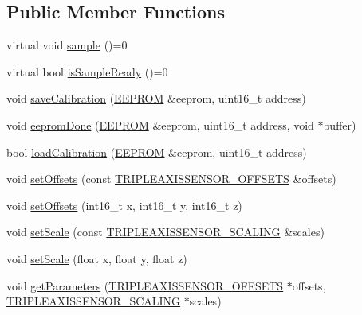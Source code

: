 \subsection*{Public Member Functions}
\begin{DoxyCompactItemize}
\item 
virtual void \hyperlink{classflame_1_1_triple_axis_sensor_ac2ff28538723dc987c6fbec20aa47341}{sample} ()=0
\item 
virtual bool \hyperlink{classflame_1_1_triple_axis_sensor_a7223b8884adf0ff42cbfddd2b6f28ce3}{is\-Sample\-Ready} ()=0
\item 
void \hyperlink{classflame_1_1_triple_axis_sensor_a8168452d055fad77782e7fd121343d61}{save\-Calibration} (\hyperlink{classflame_1_1_e_e_p_r_o_m}{E\-E\-P\-R\-O\-M} \&eeprom, uint16\-\_\-t address)
\item 
void \hyperlink{classflame_1_1_triple_axis_sensor_aaa716e2a07cc7fe544075215c1ac8a75}{eeprom\-Done} (\hyperlink{classflame_1_1_e_e_p_r_o_m}{E\-E\-P\-R\-O\-M} \&eeprom, uint16\-\_\-t address, void $\ast$buffer)
\item 
bool \hyperlink{classflame_1_1_triple_axis_sensor_a64c19829e85e70d0825be3530529d8b0}{load\-Calibration} (\hyperlink{classflame_1_1_e_e_p_r_o_m}{E\-E\-P\-R\-O\-M} \&eeprom, uint16\-\_\-t address)
\item 
void \hyperlink{classflame_1_1_triple_axis_sensor_a446b55e5557faadf8d73e0111fcaf2bd}{set\-Offsets} (const \hyperlink{namespaceflame_a9c63ea08dcbcedfed611f6afdb992301}{T\-R\-I\-P\-L\-E\-A\-X\-I\-S\-S\-E\-N\-S\-O\-R\-\_\-\-O\-F\-F\-S\-E\-T\-S} \&offsets)
\item 
void \hyperlink{classflame_1_1_triple_axis_sensor_a74daeefee092f1f32e4fd0aa7cf15bb0}{set\-Offsets} (int16\-\_\-t x, int16\-\_\-t y, int16\-\_\-t z)
\item 
void \hyperlink{classflame_1_1_triple_axis_sensor_a4147dd086c276dfdae8efcc6652f4df0}{set\-Scale} (const \hyperlink{namespaceflame_a513ac03cc7f92c4b8d7cadb972e6be72}{T\-R\-I\-P\-L\-E\-A\-X\-I\-S\-S\-E\-N\-S\-O\-R\-\_\-\-S\-C\-A\-L\-I\-N\-G} \&scales)
\item 
void \hyperlink{classflame_1_1_triple_axis_sensor_a5c4462df5fd335f83eabf60a98297cd8}{set\-Scale} (float x, float y, float z)
\item 
void \hyperlink{classflame_1_1_triple_axis_sensor_a932b8ebc27dbce01dbc7bf5265a9e5ac}{get\-Parameters} (\hyperlink{namespaceflame_a9c63ea08dcbcedfed611f6afdb992301}{T\-R\-I\-P\-L\-E\-A\-X\-I\-S\-S\-E\-N\-S\-O\-R\-\_\-\-O\-F\-F\-S\-E\-T\-S} $\ast$offsets, \hyperlink{namespaceflame_a513ac03cc7f92c4b8d7cadb972e6be72}{T\-R\-I\-P\-L\-E\-A\-X\-I\-S\-S\-E\-N\-S\-O\-R\-\_\-\-S\-C\-A\-L\-I\-N\-G} $\ast$scales)

\end{DoxyCompactItemize}
